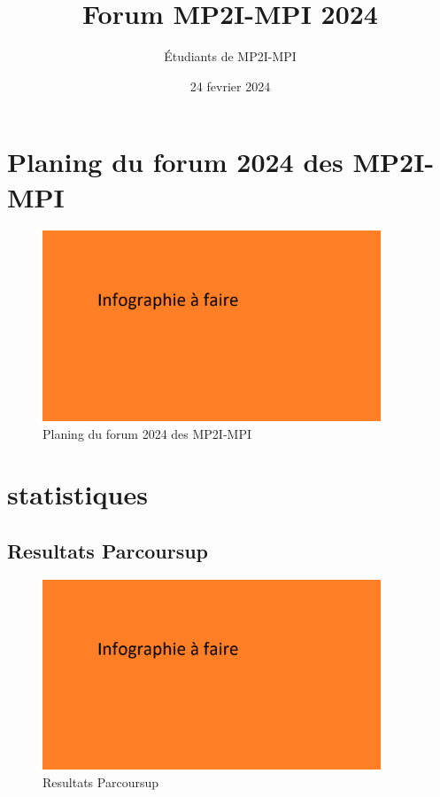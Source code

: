 \documentclass[aspectratio=169]{beamer}
\title{Forum MP2I-MPI 2024}
\author{Étudiants de MP2I-MPI}
\date{24 fevrier 2024}
\begin{document}
\begin{frame}
  \titlepage
\end{frame}


\section{Planing du forum 2024 des MP2I-MPI}

\begin{frame}
    \begin{figure}
        \centering
        \includegraphics[width=0.9\textwidth]{ressource_diapo/place older.png}
        \caption{Planing du forum 2024 des MP2I-MPI}
    \end{figure}
\end{frame}

\section{statistiques}

\subsection{Resultats Parcoursup}

\begin{frame}
    \begin{figure}
        \centering
        \includegraphics[width=0.9\textwidth]{ressource_diapo/place older.png}
        \caption{Resultats Parcoursup}
    \end{figure}
\end{frame}
\end{document}
